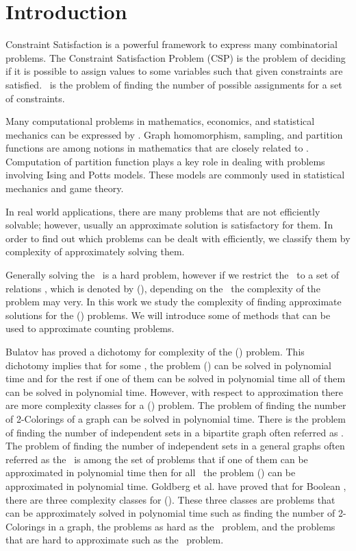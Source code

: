 \chapter{Introduction}
Constraint Satisfaction is a powerful framework to express many combinatorial problems.
The Constraint Satisfaction Problem (CSP) is the problem of deciding if it is possible to
assign values to some variables such that given constraints are satisfied. \ccsp\ 
is the problem of finding the number of possible assignments for a set of constraints.

Many computational problems in mathematics, economics, and statistical mechanics
can be expressed by \ccsp\@. Graph homomorphism, sampling,
and partition functions are among notions in mathematics
that are closely related to \ccsp\@. Computation of partition function plays a key role
in dealing with problems involving Ising and Potts models. These models are
commonly used in statistical mechanics and game theory.
 
In real world applications, there are many problems that are not efficiently solvable;
however, usually an approximate solution is satisfactory for them. 
In order to find out which problems can be dealt with efficiently, we classify them
by complexity of approximately solving them.

Generally solving the \ccsp\ is a hard problem, however if we restrict the
\ccsp\ to a set of relations \mrelset, which is denoted by \ccsp(\mrelset),
depending on the \mrelset\ the complexity of the problem may very.
In this work we study the complexity of finding approximate solutions for the 
\ccsp(\mrelset) problems.
We will introduce some of methods that can be used to approximate counting problems.

Bulatov \cite{Bulatov} has proved a dichotomy for complexity of the
\ccsp(\mrelset) problem. This dichotomy implies that 
for some \mrelset, the problem \ccsp(\mrelset) can be solved in polynomial time
and for the rest if one of them can be solved in polynomial time
all of them can be solved in polynomial time.
However, with respect to approximation there are more complexity classes for a
\ccsp(\mrelset) problem.
The problem of finding the number of 2-Colorings of a graph can be solved 
in polynomial time. There is the problem of finding the
number of independent sets in a bipartite graph often referred as \cbis\@.
The problem of finding the number of independent sets in a general graphs often referred as
the \cisp\ is among the set of problems that if one of them can be approximated in polynomial time then
for all \mrelset\, the problem \ccsp(\mrelset) can be approximated in polynomial time.
Goldberg et al. \cite{Trichotomy} have proved that for Boolean \mrelset,
there are three complexity classes for \ccsp(\mrelset)\@. These three classes are
problems that can be approximately solved in polynomial time such as finding the
number of 2-Colorings in a graph, the problems as hard as the \cbis\ problem, and the
problems that are hard to approximate such as the \cisp\ problem.


